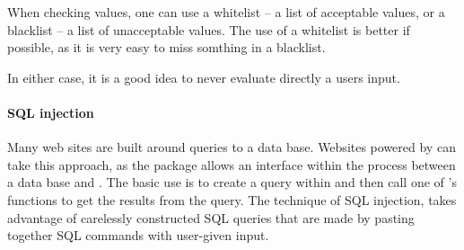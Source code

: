 When checking values, one can use a whitelist -- a list of acceptable
values, or a blacklist -- a list of unacceptable values. The use of a
whitelist is better if possible, as it is very easy to miss somthing in
a blacklist.

In either case, it is a good idea to never evaluate directly a users input.


\paragraph{SQL injection}
Many web sites are built around queries to a data base. Websites
powered by  can take this approach, as the 
package allows an interface within the \R\/ process between a data
base and \R. The basic use is to create a query within \R\/ and then
call one of 's functions to get the results from the
query. The technique of SQL injection, takes advantage of carelessly
constructed SQL queries that are made by pasting together SQL commands
with user-given input. 


